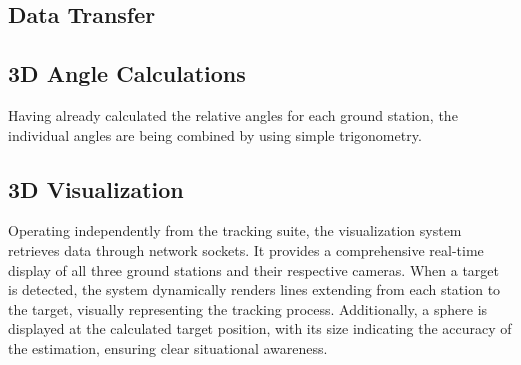 \subsection{Data Transfer}


\subsection{3D Angle Calculations}
Having already calculated the relative angles for each ground station, the individual angles are being combined by using simple trigonometry. 



\subsection{3D Visualization}
Operating independently from the tracking suite, the visualization system retrieves data through network sockets. It provides a comprehensive real-time display of all three ground stations and their respective cameras. When a target is detected, the system dynamically renders lines extending from each station to the target, visually representing the tracking process. Additionally, a sphere is displayed at the calculated target position, with its size indicating the accuracy of the estimation, ensuring clear situational awareness.
